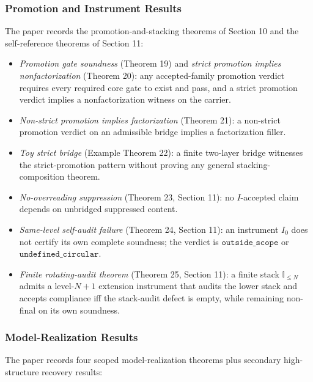 \documentclass[11pt]{article}
\providecommand{\tightlist}{}
\theoremstyle{definition}
\begin{document}
\subsubsection{Promotion and Instrument Results}

The paper records the promotion-and-stacking theorems of Section 10 and the self-reference theorems of Section 11:

\begin{itemize}
\tightlist
\item
  \emph{Promotion gate soundness} (Theorem 19) and \emph{strict promotion implies nonfactorization} (Theorem 20): any accepted-family promotion verdict requires every required core gate to exist and pass, and a strict promotion verdict implies a nonfactorization witness on the carrier.
\item
  \emph{Non-strict promotion implies factorization} (Theorem 21): a non-strict promotion verdict on an admissible bridge implies a factorization filler.
\item
  \emph{Toy strict bridge} (Example Theorem 22): a finite two-layer bridge witnesses the strict-promotion pattern without proving any general stacking-composition theorem.
\item
  \emph{No-overreading suppression} (Theorem 23, Section 11): no \(I\)-accepted claim depends on unbridged suppressed content.
\item
  \emph{Same-level self-audit failure} (Theorem 24, Section 11): an instrument \(I_{0}\) does not certify its own complete soundness; the verdict is \(\texttt{outside\_scope}\) or \(\texttt{undefined\_circular}\).
\item
  \emph{Finite rotating-audit theorem} (Theorem 25, Section 11): a finite stack \(\mathbb I_{\le N}\) admits a level-\(N+1\) extension instrument that audits the lower stack and accepts compliance iff the stack-audit defect is empty, while remaining non-final on its own soundness.
\end{itemize}

\subsubsection{Model-Realization Results}

The paper records four scoped model-realization theorems plus secondary high-structure recovery results:
\end{document}
